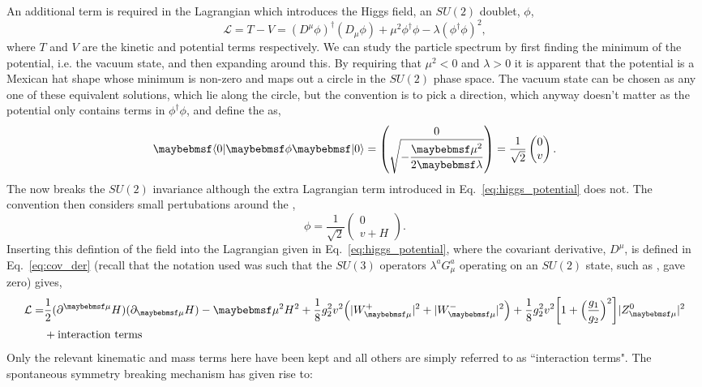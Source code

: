 An additional term is required in the \SM Lagrangian which introduces the Higgs field, an $SU(2)$ doublet, $\phi$,
\begin{equation}
  \mathcal{L} = T - V = (D^{\mu}\phi)^{\dagger}(D_{\mu}\phi) + \mu^{2}\phi^{\dagger}\phi - \lambda(\phi^{\dagger}\phi)^{2},
  \label{eq:higgs_potential}
\end{equation}
where $T$ and $V$ are the kinetic and potential terms respectively. We can study the particle spectrum by first finding the minimum of the potential, i.e. the vacuum state, and then expanding around this. By requiring that $\mu^{2}<0$ and $\lambda>0$ it is apparent that the potential is a Mexican hat shape whose minimum is non-zero and maps out a circle in the $SU(2)$ phase space. The vacuum state can be chosen as any one of these equivalent solutions, which lie along the circle, but the convention is to pick a direction, which anyway doesn't matter as the potential only contains terms in $\phi^{\dagger}\phi$, and define the \VEV as,
\begin{equation}
  \bra{0}\phi\ket{0} = \begin{pmatrix} 0 \\ \sqrt{-\dfrac{\mu^{2}}{2\lambda}} \end{pmatrix} = \frac{1}{\sqrt{2}} \begin{pmatrix} 0 \\ v \end{pmatrix}.
\end{equation}
The \VEV now breaks the $SU(2)$ invariance although the extra Lagrangian term introduced in Eq.~\ref{eq:higgs_potential} does not. The convention then considers small pertubations around the \VEV,
\begin{equation}
  \phi = \dfrac{1}{\sqrt{2}}\begin{pmatrix} 0 \\ v+H \end{pmatrix}.
\end{equation}
Inserting this defintion of the field \phi into the Lagrangian given in Eq.~\ref{eq:higgs_potential}, where the covariant derivative, $D^{\mu}$, is defined in Eq.~\ref{eq:cov_der} (recall that the notation used was such that the $SU(3)$ operators $\lambda^{a}G^{a}_{\mu}$ operating on an $SU(2)$ state, such as \phi, gave zero) gives,
\begin{align}
  \mathcal{L} = & \frac{1}{2}(\partial^{\mu}H)(\partial_{\mu}H) - \mu^{2}H^{2} + \frac{1}{8}g_{2}^{2}v^{2}\Bigl(|W_{\mu}^{+}|^{2}+|W_{\mu}^{-}|^{2}\Bigr) +\frac{1}{8}g_{2}^{2}v^{2}\biggl[1+\Bigl(\frac{g_{1}}{g_{2}}\Bigr)^{2}\biggr]|Z^{0}_{\mu}|^{2} \nonumber\\ 
  & + \mbox{interaction terms} 
\end{align}
Only the relevant kinematic and mass terms here have been kept and all others are simply referred to as ``interaction terms". The spontaneous symmetry breaking mechanism has given rise to:

